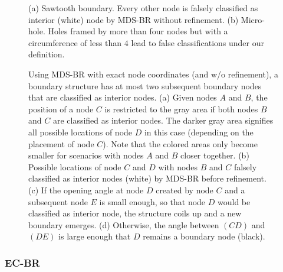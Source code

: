 \documentclass{llncs}
\begin{document}
\begin{figure}[t]
\centering
\hfill
{}
\hfill
{}
\hfill{}
\caption{(a) Sawtooth boundary. Every other node is falsely classified as interior (white) node by MDS-BR without refinement. (b) Micro-hole. Holes framed by more than four nodes but with a circumference of less than $4$ lead to false classifications under our definition.}
\label{fig:mdsbr_guarantee_1}
\end{figure}

\begin{figure}[t]
\centering
\hfill
{}
\hfill
{}
\hfill
{}
\hfill
{}
\hfill{}
\caption{Using MDS-BR with exact node coordinates (and w/o refinement), a boundary structure has at most two subsequent boundary nodes that are classified as interior nodes.
(a) Given nodes $A$ and $B$, the position of a node $C$ is restricted to the gray area if both nodes $B$ and $C$ are classified as interior nodes.
The darker gray area signifies all possible locations of node $D$ in this case (depending on the placement of node $C$).
Note that the colored areas only become smaller for scenarios with nodes $A$ and $B$ closer together.
(b) Possible locations of node $C$ and $D$ with nodes $B$ and $C$ falsely classified as interior nodes (white) by MDS-BR before refinement.
(c) If the opening angle at node $D$ created by node $C$ and a subsequent node $E$ is small enough, so that node $D$ would be classified as interior node, the structure coils up and a new boundary emerges.
(d) Otherwise, the angle between $(CD)$ and $(DE)$ is large enough that $D$ remains a boundary node (black).}
\label{fig:mdsbr_guarantee_2}
\end{figure}

\subsubsection{EC-BR}
\end{document}
